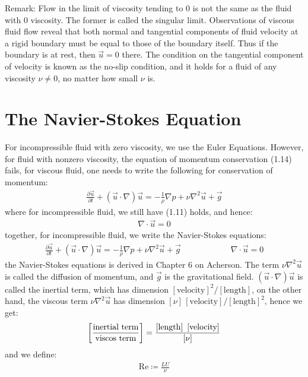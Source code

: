 \documentclass[11pt]{book}
\theoremstyle{break}
\theoremstyle{break}
\newcommand{\remark}{\color{blue}Remark: \color{black}}
\begin{document}
\remark Flow in the limit of viscosity tending to $0$ is not the same as the fluid with $0$ viscosity. The former is called the singular limit. Observations of viscous fluid flow reveal that both normal and tangential components of fluid velocity at a rigid boundary must be equal to those of the boundary itself. Thus if the boundary is at rest, then $\vec{u} = 0$ there. The condition on the tangential component of velocity is known as the no-slip condition, and it holds for a fluid of any viscosity $\nu \neq 0$, no matter how small $\nu$ is. \\


\newpage
\section[The Navier-Stokes Equations]{\color{red}The Navier-Stokes Equation \color{black}}
For incompressible fluid with zero viscosity, we use the Euler Equations. However, for fluid with nonzero viscosity, the equation of momentum conservation (1.14) fails, for viscous fluid, one needs to write the following for conservation of momentum:
\begin{align}
\frac{\partial \vec{u}}{\partial t} + (\vec{u}\cdot \nabla) \vec{u} = -\frac{1}{\rho}\nabla p + \nu \nabla^2 \vec{u}+ \vec{g}
\end{align}
where for incompressible fluid, we still have (1.11) holds, and hence:
\begin{align}
\nabla \cdot \vec{u} = 0
\end{align}
together, for incompressible fluid, we write the Navier-Stokes equations:
\begin{align}
\frac{\partial \vec{u}}{\partial t} + (\vec{u}\cdot \nabla) \vec{u} = -\frac{1}{\rho}\nabla p + \nu \nabla^2 \vec{u}+ \vec{g} \qquad\qquad\qquad\nabla \cdot \vec{u} = 0
\end{align}
the Navier-Stokes equations is derived in Chapter 6 on Acherson. The term $\nu \nabla^2 \vec{u}$ is called the diffusion of momentum, and $\vec{g}$ is the gravitational field. $(\vec{u}\cdot \nabla) \vec{u}$ is called the inertial term, which has dimension $[\text{velocity}]^2/[\text{length}]$, on the other hand, the viscous term $\nu \nabla^2 \vec{u}$ has dimension $[\nu]\,[\text{velocity}] / [\text{length}]^2$, hence we get:
\begin{align*}
\left[\frac{\text{inertial term}}{\text{viscos term}}\right] = \frac{\text{[length]\, [\text{velocity}]}}{[\nu]}
\end{align*}
and we define:
\begin{align*}
\text{Re} \coloneqq  \frac{L U}{\nu}
\end{align*}
\end{document}

